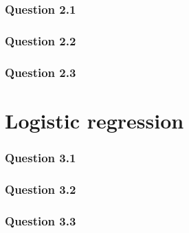 \documentclass{article}
\begin{document}
\subsubsection*{Question 2.1}

\subsubsection*{Question 2.2}

\subsubsection*{Question 2.3}

\section{Logistic regression}


\subsubsection*{Question 3.1}


\subsubsection*{Question 3.2}


\subsubsection*{Question 3.3}


\printbibliography
\end{document}
